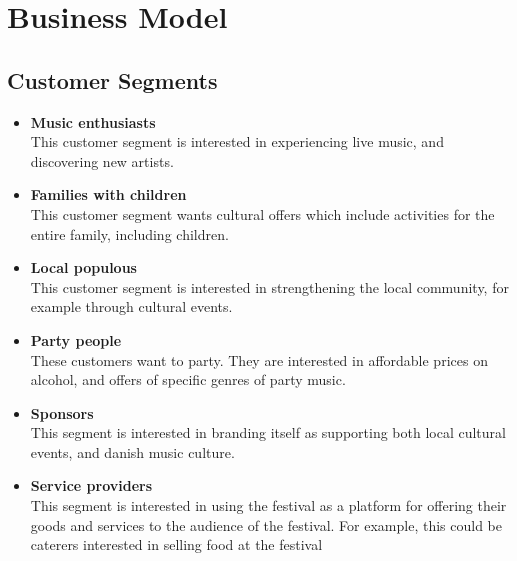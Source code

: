 \section{Business Model} %
\label{sec:business_model}
\subsection{Customer Segments} %
\label{sub:customer_segments}
\begin{itemize}
(baseret på møde med kristian og stakke)
	\item \textbf{Music enthusiasts}\\
			This customer segment is interested in experiencing live music, and discovering new artists.
	\item \textbf{Families with children}\\
			This customer segment wants cultural offers which include activities for the entire family, including children.
	\item \textbf{Local populous}\\
			This customer segment is interested in strengthening the local community, for example through cultural events. 
	\item \textbf{Party people}\\
			These customers want to party. They are interested in affordable prices on alcohol, and offers of specific genres of party music.
	\item \textbf{Sponsors}\\
			This segment is interested in branding itself as supporting both local cultural events, and danish music culture.
	\item \textbf{Service providers}\\
		This segment is interested in using the festival as a platform for offering their goods and services to the audience of the festival. For example, this could be caterers interested in selling food at the festival
\end{itemize}
